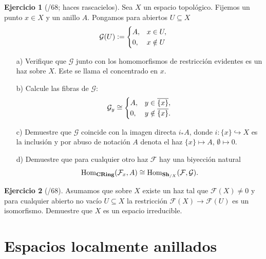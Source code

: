 \documentclass{article}
\numberwithin{equation}{section}
\newcounter{ejerctot}
\newcommand{\ejerccount}{\stepcounter{ejerctot}\theejerctot/68}
\theoremstyle{definition}
\newtheorem{ejerc}{Ejercicio}[section]
\begin{document}
\begin{ejerc}[\ejerccount; haces rascacielos]
  Sea $X$ un espacio topológico. Fijemos un punto $x\in X$ y un anillo
  $A$. Pongamos para abiertos $U \subseteq X$
  \[ \mathcal{G} (U) \mathrel{\mathop:}= \begin{cases}
      A, & x\in U,\\
      0, & x\notin U
    \end{cases} \]

  \begin{enumerate}
  \item[a)] Verifique que $\mathcal{G}$ junto con los homomorfismos de
    restricción evidentes es un haz sobre $X$. Este se llama el
     concentrado en $x$.

  \item[b)] Calcule las fibras de $\mathcal{G}$:
    \[ \mathcal{G}_y \cong \begin{cases}
        A, & y \in \overline{\{ x \}},\\
        0, & y \notin \overline{\{ x \}}.
      \end{cases} \]

  \item[c)] Demuestre que $\mathcal{G}$ coincide con la imagen directa $i_* A$,
    donde $i\colon \{ x \} \hookrightarrow X$ es la inclusión y por abuso de
    notación $A$ denota el haz $\{ x \} \mapsto A$, $\emptyset \mapsto 0$.

  \item[d)] Demuestre que para cualquier otro haz $\mathcal{F}$ hay una
    biyección natural
    \[ \operatorname{Hom}_{\text{\bf CRing}} (\mathcal{F}_x, A) \cong
       \operatorname{Hom}_{\text{\bf Sh}_{/X}} (\mathcal{F}, \mathcal{G}). \]
  \end{enumerate}
\end{ejerc}

\begin{ejerc}[\ejerccount]
  Asumamos que sobre $X$ existe un haz tal que $\mathcal{F} (X) \ne 0$ y para
  cualquier abierto no vacío $U \subseteq X$ la restricción
  $\mathcal{F} (X) \to \mathcal{F} (U)$ es un isomorfismo. Demuestre que $X$
  es un espacio irreducible.
\end{ejerc}


\pagebreak
\section{Espacios localmente anillados}
\end{document}
